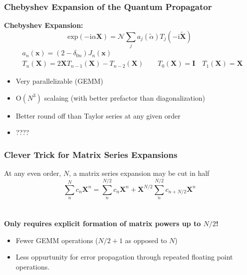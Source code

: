 \documentclass{beamer}
\newcommand{\bpar}[1]{\left( #1 \right)}                  %
\renewcommand{\exp}[1]{\mathrm{exp}\bpar{#1}}
\begin{document}
\begin{frame}
\frametitle{Chebyshev Expansion of the Quantum Propagator}

\textbf{Chebyshev Expansion:}
\begin{equation*}
\exp{-\mathrm{i}\alpha \mathbf{X}} = \mathcal{N} \sum_j  a_j(\tilde{\alpha})T_j(-\mathrm{i}\tilde{\mathbf{X}})
\end{equation*}
\begin{align*}
&a_n(\mathbf{x}) = (2 - \delta_{0n})J_n(\mathbf{x})\\
&T_n(\mathbf{X}) = 2\mathbf{X}T_{n-1}(\mathbf{X}) - T_{n-2}(\mathbf{X}) \qquad T_0(\mathbf{X}) = \mathbf{I} \quad T_1(\mathbf{X}) = \mathbf{X}
\end{align*}

\begin{itemize}
  \color{green}
  \item Very parallelizable (GEMM)
  \item O$(N^3)$ scalaing (with better prefactor than diagonalization)
  \item Better round off than Taylor series at any given order
\end{itemize}
\begin{itemize}
  \color{red}
  \item ????
\end{itemize}

\end{frame}

\begin{frame}
\frametitle{Clever Trick for Matrix Series Expansions}

At any even order, $N$,  a matrix series expansion may be cut in half
\begin{equation*}
\sum_n^N c_n \mathbf{X}^n = \sum_n^{N/2} c_n \mathbf{X}^n + \mathbf{X}^{N/2}\sum_n^{N/2} c_{n+N/2}\mathbf{X}^n
\end{equation*}
~\\
~\\

{ \bf
Only requires explicit formation of matrix powers up to $N/2$!
}
\begin{itemize}
  \item Fewer GEMM operations ($N/2 + 1$ as opposed to $N$)
  \item Less oppurtunity for error propagation through repeated floating point operations.
\end{itemize}
\end{frame}
\end{document}
